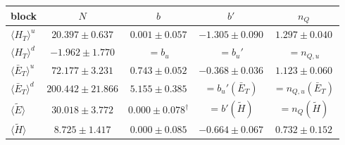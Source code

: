 \begin{tabular}{lcccc}
\toprule
block & $N$ & $b$ & $b'$ & $n_Q$ \\
\midrule
$\langle H_T\rangle^u$ & $20.397 \pm 0.637$ & $0.001 \pm 0.057$ & $-1.305 \pm 0.090$ & $1.297 \pm 0.040$ \\
$\langle H_T\rangle^d$ & $-1.962 \pm 1.770$ & $=b_u$ & $=b_u'$ & $=n_{Q,u}$ \\
$\langle \bar E_T\rangle^u$ & $72.177 \pm 3.231$ & $0.743 \pm 0.052$ & $-0.368 \pm 0.036$ & $1.123 \pm 0.060$ \\
$\langle \bar E_T\rangle^d$ & $200.442 \pm 21.866$ & $5.155 \pm 0.385$ & $=b_u'(\bar E_T)$ & $=n_{Q,u}(\bar E_T)$ \\
$\langle \tilde E\rangle$ & $30.018 \pm 3.772$ & $0.000 \pm 0.078$$^{\dagger}$ & $=b'(\tilde H)$ & $=n_Q(\tilde H)$ \\
$\langle \tilde H\rangle$ & $8.725 \pm 1.417$ & $0.000 \pm 0.085$ & $-0.664 \pm 0.067$ & $0.732 \pm 0.152$ \\
\bottomrule
\end{tabular}
